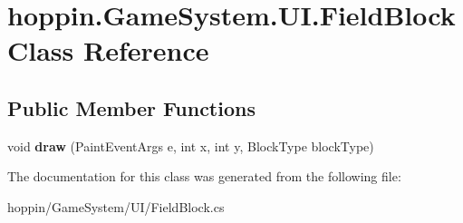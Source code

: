 \hypertarget{classhoppin_1_1_game_system_1_1_u_i_1_1_field_block}{}\section{hoppin.\+Game\+System.\+U\+I.\+Field\+Block Class Reference}
\label{classhoppin_1_1_game_system_1_1_u_i_1_1_field_block}
\subsection*{Public Member Functions}
\begin{DoxyCompactItemize}
\item 
void {\bfseries draw} (Paint\+Event\+Args e, int x, int y, Block\+Type block\+Type)\hypertarget{classhoppin_1_1_game_system_1_1_u_i_1_1_field_block_a8b1e67b9c2bc0b569ec2894dcd420a37}{}\label{classhoppin_1_1_game_system_1_1_u_i_1_1_field_block_a8b1e67b9c2bc0b569ec2894dcd420a37}

\end{DoxyCompactItemize}


The documentation for this class was generated from the following file\+:\begin{DoxyCompactItemize}
\item 
hoppin/\+Game\+System/\+U\+I/Field\+Block.\+cs\end{DoxyCompactItemize}
